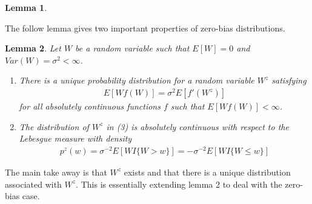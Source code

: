 \documentclass[11pt]{article}
\newtheorem{lemma}{Lemma}
\begin{document}
\begin{flushleft}
\begin{lemma}
\begin{enumerate}
  \end{enumerate}
\end{lemma}

The follow lemma gives two important properties of zero-bias distributions.
\begin{lemma}
Let $W$ be a random variable such that $E[W] = 0$ and $Var(W) = \sigma^2 < \infty$. 
\begin{enumerate}
\item
There is a unique probability distribution for a random variable $W^z$ satisfying
\begin{align*}
E[Wf(W)] = \sigma^2 E[f'(W^z)] \tag{3}
\end{align*}
for all absolutely continuous functions $f$ such that $E[Wf(W)] < \infty$.
\item
The distribution of $W^z$  in (3) is absolutely continuous with respect to the Lebesgue measure with density
\begin{align*}
p^z(w) = \sigma^{-2} E[W I\{W > w\}] = -\sigma^{-2} E[W I\{W \leq w\}]
\end{align*}
\end{enumerate}
  \end{lemma}
The main take away is that $W^z$ exists and that there is a unique distribution associated with $W^z$.
This is essentially extending lemma 2 to deal with the zero-bias case.


\end{flushleft}
\end{document}
